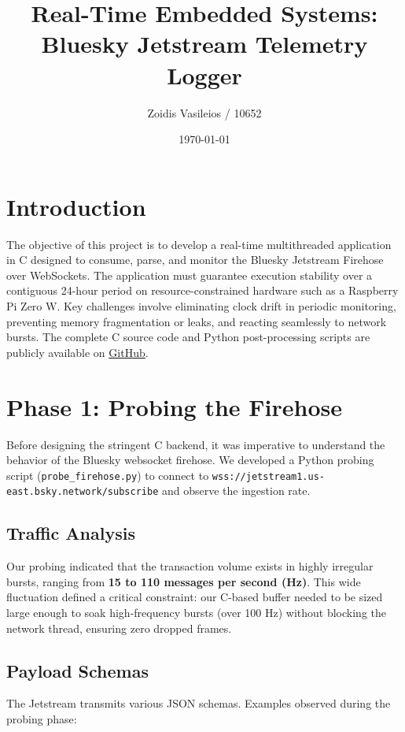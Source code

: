 \documentclass[12pt,a4paper]{article}
\title{Real-Time Embedded Systems: Bluesky Jetstream Telemetry Logger}
\author{Zoidis Vasileios / 10652}
\date{\today}
\begin{document}
\maketitle
\tableofcontents
\newpage

\section{Introduction}
The objective of this project is to develop a real-time multithreaded application in C designed to consume, parse, and monitor the Bluesky Jetstream Firehose over WebSockets. The application must guarantee execution stability over a contiguous 24-hour period on resource-constrained hardware such as a Raspberry Pi Zero W. Key challenges involve eliminating clock drift in periodic monitoring, preventing memory fragmentation or leaks, and reacting seamlessly to network bursts. The complete C source code and Python post-processing scripts are publicly available on \href{https://github.com/vgzoidis/Real-Time_Embedded_Systems_Projects/tree/main/Final_Project}{\underline{GitHub}}.

\section{Phase 1: Probing the Firehose}
Before designing the stringent C backend, it was imperative to understand the behavior of the Bluesky websocket firehose. We developed a Python probing script (\texttt{probe\_firehose.py}) to connect to \texttt{wss://jetstream1.us-east.bsky.network/subscribe} and observe the ingestion rate.

\subsection{Traffic Analysis}
Our probing indicated that the transaction volume exists in highly irregular bursts, ranging from \textbf{15 to 110 messages per second (Hz)}. This wide fluctuation defined a critical constraint: our C-based buffer needed to be sized large enough to soak high-frequency bursts (over 100 Hz) without blocking the network thread, ensuring zero dropped frames.

\subsection{Payload Schemas}
The Jetstream transmits various JSON schemas. Examples observed during the probing phase:
\end{document}
